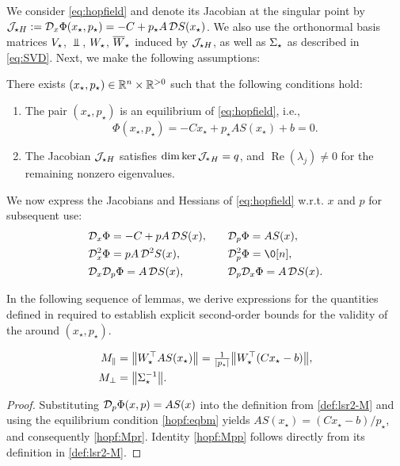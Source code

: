 \documentclass[a4paper]{cas-dc}
\begin{document}
We consider \eqref{eq:hopfield} and denote its Jacobian at the singular point by \(\J[H] := \Dx\Phi(x_{\star},p_{\star}) = -C + p_{\star} A \, \D S(x_{\star})\). We also use the orthonormal basis matrices \(\V\), \(\Vbar\), \(\W\), \(\Wbar\) induced by \(\J[H]\), as well as \(\s\) as described in \eqref{eq:SVD}. Next, we make the following assumptions:
\begin{assumption}
    \label{asmp:hopfield}
    There exists \((x_{\star},p_{\star}) \in \R[n] \times \R[>0]\) such that the following conditions hold:
    \begin{enumerate}
        \item The pair \((x_{\star},p_{\star})\) is an equilibrium of \eqref{eq:hopfield}, i.e.,
              \begin{equation}
                  \Phi(x_{\star}, p_{\star}) = -Cx_{\star} + p_{\star}AS(x_{\star}) + b = 0. \label{hopf:eqbm}
              \end{equation}
        \item The Jacobian \(\J[H]\) satisfies \(\dim{\ker{\J}_{H}} = q\), and \(\operatorname{Re}(\lambda_{j}) \neq 0\) for the remaining nonzero eigenvalues.
    \end{enumerate}
\end{assumption}

We now express the Jacobians and Hessians of \eqref{eq:hopfield} w.r.t. \(x\) and \(p\) for subsequent use:
\begin{alignat}{2}
     & \Dx    \Phi = -C + p A \, \D S(x), \quad &  & \Dp    \Phi = AS(x),        \label{hopf:D1} \\
     & \Dx^2  \Phi = p A \, \D^2S(x),     \quad &  & \Dp^2  \Phi = \0[n],        \label{hopf:D2} \\
     & \Dx\Dp \Phi = A \, \D S(x),        \quad &  & \Dp\Dx \Phi = A \, \D S(x). \label{hopf:DD}
\end{alignat}

In the following sequence of lemmas, we derive expressions for the quantities defined in  required to establish explicit second-order bounds for the validity of the \LSR{} around \((x_{\star},p_{\star})\).

\begin{lemma}
    \label{hopf:M}
    \begin{subequations}
        \begin{align}
            \Mpr & = \norm{\W^{\top} A S(x_{\star})} = \tfrac{1}{\abs{p_{\star}}}\norm{\W^{\top}(C x_{\star} - b)}, \label{hopf:Mpr} \\
            \Mpp & = \norm{\s^{-1}}. \label{hopf:Mpp}
        \end{align}
    \end{subequations}
\end{lemma}
\begin{proof}
    Substituting \(\Dp\Phi(x,p)=AS(x)\) into the definition from \eqref{def:lsr2-M} and using the equilibrium condition \eqref{hopf:eqbm} yields \(AS(x_{\star}) = (Cx_{\star}-b)/p_{\star}\), and consequently \eqref{hopf:Mpr}. Identity \eqref{hopf:Mpp} follows directly from its definition in \eqref{def:lsr2-M}.
\end{proof}
\end{document}
